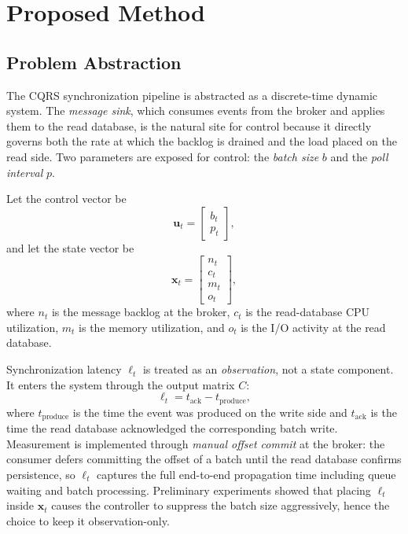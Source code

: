 \section{Proposed Method}

\subsection{Problem Abstraction}

The CQRS synchronization pipeline is abstracted as a discrete-time dynamic system. The \textit{message sink}, which consumes events from the broker and applies them to the read database, is the natural site for control because it directly governs both the rate at which the backlog is drained and the load placed on the read side. Two parameters are exposed for control: the \textit{batch size} $b$ and the \textit{poll interval} $p$.

Let the control vector be
\begin{equation}
\mathbf{u}_t = \begin{bmatrix} b_t \\ p_t \end{bmatrix},
\label{eq:control-vec}
\end{equation}
and let the state vector be
\begin{equation}
\mathbf{x}_t = \begin{bmatrix} n_t \\ c_t \\ m_t \\ o_t \end{bmatrix},
\label{eq:state-vec}
\end{equation}
where $n_t$ is the message backlog at the broker, $c_t$ is the read-database CPU utilization, $m_t$ is the memory utilization, and $o_t$ is the I/O activity at the read database.

Synchronization latency $\ell_t$ is treated as an \textit{observation}, not a state component. It enters the system through the output matrix $C$:
\begin{equation}
\ell_t = t_{\text{ack}} - t_{\text{produce}},
\label{eq:latency}
\end{equation}
where $t_{\text{produce}}$ is the time the event was produced on the write side and $t_{\text{ack}}$ is the time the read database acknowledged the corresponding batch write. Measurement is implemented through \textit{manual offset commit} at the broker: the consumer defers committing the offset of a batch until the read database confirms persistence, so $\ell_t$ captures the full end-to-end propagation time including queue waiting and batch processing. Preliminary experiments showed that placing $\ell_t$ inside $\mathbf{x}_t$ causes the controller to suppress the batch size aggressively, hence the choice to keep it observation-only.

